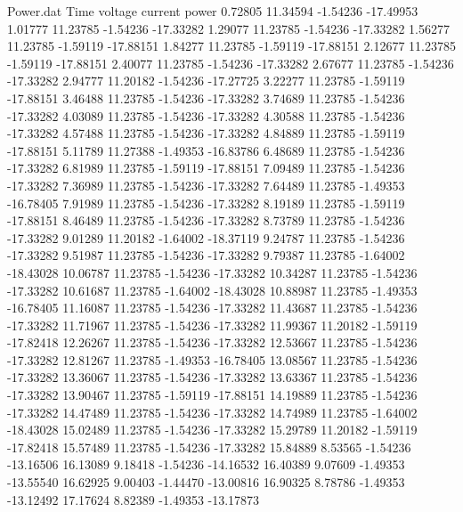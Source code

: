 \begin{filecontents}{Power.dat}
Time voltage current power
   0.72805   11.34594   -1.54236  -17.49953
   1.01777   11.23785   -1.54236  -17.33282
   1.29077   11.23785   -1.54236  -17.33282
   1.56277   11.23785   -1.59119  -17.88151
   1.84277   11.23785   -1.59119  -17.88151
   2.12677   11.23785   -1.59119  -17.88151
   2.40077   11.23785   -1.54236  -17.33282
   2.67677   11.23785   -1.54236  -17.33282
   2.94777   11.20182   -1.54236  -17.27725
   3.22277   11.23785   -1.59119  -17.88151
   3.46488   11.23785   -1.54236  -17.33282
   3.74689   11.23785   -1.54236  -17.33282
   4.03089   11.23785   -1.54236  -17.33282
   4.30588   11.23785   -1.54236  -17.33282
   4.57488   11.23785   -1.54236  -17.33282
   4.84889   11.23785   -1.59119  -17.88151
   5.11789   11.27388   -1.49353  -16.83786
   6.48689   11.23785   -1.54236  -17.33282
   6.81989   11.23785   -1.59119  -17.88151
   7.09489   11.23785   -1.54236  -17.33282
   7.36989   11.23785   -1.54236  -17.33282
   7.64489   11.23785   -1.49353  -16.78405
   7.91989   11.23785   -1.54236  -17.33282
   8.19189   11.23785   -1.59119  -17.88151
   8.46489   11.23785   -1.54236  -17.33282
   8.73789   11.23785   -1.54236  -17.33282
   9.01289   11.20182   -1.64002  -18.37119
   9.24787   11.23785   -1.54236  -17.33282
   9.51987   11.23785   -1.54236  -17.33282
   9.79387   11.23785   -1.64002  -18.43028
  10.06787   11.23785   -1.54236  -17.33282
  10.34287   11.23785   -1.54236  -17.33282
  10.61687   11.23785   -1.64002  -18.43028
  10.88987   11.23785   -1.49353  -16.78405
  11.16087   11.23785   -1.54236  -17.33282
  11.43687   11.23785   -1.54236  -17.33282
  11.71967   11.23785   -1.54236  -17.33282
  11.99367   11.20182   -1.59119  -17.82418
  12.26267   11.23785   -1.54236  -17.33282
  12.53667   11.23785   -1.54236  -17.33282
  12.81267   11.23785   -1.49353  -16.78405
  13.08567   11.23785   -1.54236  -17.33282
  13.36067   11.23785   -1.54236  -17.33282
  13.63367   11.23785   -1.54236  -17.33282
  13.90467   11.23785   -1.59119  -17.88151
  14.19889   11.23785   -1.54236  -17.33282
  14.47489   11.23785   -1.54236  -17.33282
  14.74989   11.23785   -1.64002  -18.43028
  15.02489   11.23785   -1.54236  -17.33282
  15.29789   11.20182   -1.59119  -17.82418
  15.57489   11.23785   -1.54236  -17.33282
  15.84889    8.53565   -1.54236  -13.16506
  16.13089    9.18418   -1.54236  -14.16532
  16.40389    9.07609   -1.49353  -13.55540
  16.62925    9.00403   -1.44470  -13.00816
  16.90325    8.78786   -1.49353  -13.12492
  17.17624    8.82389   -1.49353  -13.17873

\end{filecontents}
